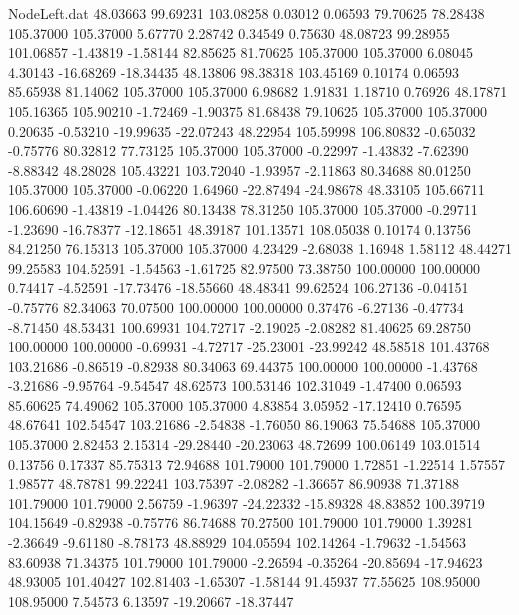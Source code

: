 \begin{filecontents}{NodeLeft.dat}
  48.03663   99.69231  103.08258     0.03012    0.06593   79.70625   78.28438  105.37000  105.37000    5.67770    2.28742    0.34549    0.75630
  48.08723   99.28955  101.06857    -1.43819   -1.58144   82.85625   81.70625  105.37000  105.37000    6.08045    4.30143  -16.68269  -18.34435
  48.13806   98.38318  103.45169     0.10174    0.06593   85.65938   81.14062  105.37000  105.37000    6.98682    1.91831    1.18710    0.76926
  48.17871  105.16365  105.90210    -1.72469   -1.90375   81.68438   79.10625  105.37000  105.37000    0.20635   -0.53210  -19.99635  -22.07243
  48.22954  105.59998  106.80832    -0.65032   -0.75776   80.32812   77.73125  105.37000  105.37000   -0.22997   -1.43832   -7.62390   -8.88342
  48.28028  105.43221  103.72040    -1.93957   -2.11863   80.34688   80.01250  105.37000  105.37000   -0.06220    1.64960  -22.87494  -24.98678
  48.33105  105.66711  106.60690    -1.43819   -1.04426   80.13438   78.31250  105.37000  105.37000   -0.29711   -1.23690  -16.78377  -12.18651
  48.39187  101.13571  108.05038     0.10174    0.13756   84.21250   76.15313  105.37000  105.37000    4.23429   -2.68038    1.16948    1.58112
  48.44271   99.25583  104.52591    -1.54563   -1.61725   82.97500   73.38750  100.00000  100.00000    0.74417   -4.52591  -17.73476  -18.55660
  48.48341   99.62524  106.27136    -0.04151   -0.75776   82.34063   70.07500  100.00000  100.00000    0.37476   -6.27136   -0.47734   -8.71450
  48.53431  100.69931  104.72717    -2.19025   -2.08282   81.40625   69.28750  100.00000  100.00000   -0.69931   -4.72717  -25.23001  -23.99242
  48.58518  101.43768  103.21686    -0.86519   -0.82938   80.34063   69.44375  100.00000  100.00000   -1.43768   -3.21686   -9.95764   -9.54547
  48.62573  100.53146  102.31049    -1.47400    0.06593   85.60625   74.49062  105.37000  105.37000    4.83854    3.05952  -17.12410    0.76595
  48.67641  102.54547  103.21686    -2.54838   -1.76050   86.19063   75.54688  105.37000  105.37000    2.82453    2.15314  -29.28440  -20.23063
  48.72699  100.06149  103.01514     0.13756    0.17337   85.75313   72.94688  101.79000  101.79000    1.72851   -1.22514    1.57557    1.98577
  48.78781   99.22241  103.75397    -2.08282   -1.36657   86.90938   71.37188  101.79000  101.79000    2.56759   -1.96397  -24.22332  -15.89328
  48.83852  100.39719  104.15649    -0.82938   -0.75776   86.74688   70.27500  101.79000  101.79000    1.39281   -2.36649   -9.61180   -8.78173
  48.88929  104.05594  102.14264    -1.79632   -1.54563   83.60938   71.34375  101.79000  101.79000   -2.26594   -0.35264  -20.85694  -17.94623
  48.93005  101.40427  102.81403    -1.65307   -1.58144   91.45937   77.55625  108.95000  108.95000    7.54573    6.13597  -19.20667  -18.37447

\end{filecontents}
